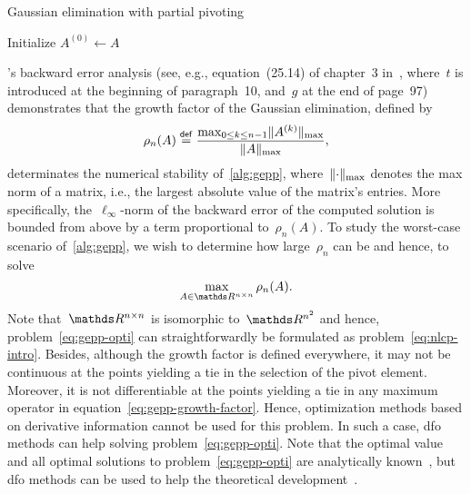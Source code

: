 \begin{algorithm}[ht]
    \caption{Gaussian elimination with partial pivoting}
    \label{alg:gepp}
    \DontPrintSemicolon
    Initialize $A^{(0)} \gets A$\;
\end{algorithm}

's backward error analysis (see, e.g., equation~(25.14) of chapter~3 in~\cite{Wilkinson_1963}, where~$t$ is introduced at the beginning of paragraph~10, and~$g$ at the end of page~97) demonstrates that the growth factor of the Gaussian elimination, defined by
\begin{equation}
    \label{eq:gepp-growth-factor}
    \rho_n(A) \mathrel{\stackrel{\mathsf{def}}{=}} \frac{\max_{0 \le k \le n - 1} \lVert A^{(k)}\rVert_{\max}}{\lVert A\rVert_{\max}},
\end{equation}
determinates the numerical stability of~\cref{alg:gepp}, where~$\lVert\cdot\rVert_{\max}$ denotes the max norm of a matrix, i.e., the largest absolute value of the matrix's entries.
More specifically, the~$\ell_{\infty}$-norm of the backward error of the computed solution is bounded from above by a term proportional to~$\rho_n(A)$.
To study the worst-case scenario of~\cref{alg:gepp}, we wish to determine how large~$\rho_n$ can be and hence, to solve
\begin{equation}
    \label{eq:gepp-opti}
    \max_{A \in \R^{n \times n}} \rho_n(A).
\end{equation}
Note that~$\R^{n \times n}$ is isomorphic to~$\R^{n^2}$ and hence, problem~\cref{eq:gepp-opti} can straightforwardly be formulated as problem~\cref{eq:nlcp-intro}.
Besides, although the growth factor is defined everywhere, it may not be continuous at the points yielding a tie in the selection of the pivot element.
Moreover, it is not differentiable at the points yielding a tie in any maximum operator in equation~\cref{eq:gepp-growth-factor}.
Hence, optimization methods based on derivative information cannot be used for this problem.
In such a case, \gls{dfo} methods can help solving problem~\cref{eq:gepp-opti}.
Note that the optimal value and all optimal solutions to problem~\cref{eq:gepp-opti} are analytically known~\cite{Higham_Higham_1989}, but \gls{dfo} methods can be used to help the theoretical development~\cite{Higham_1993}.


